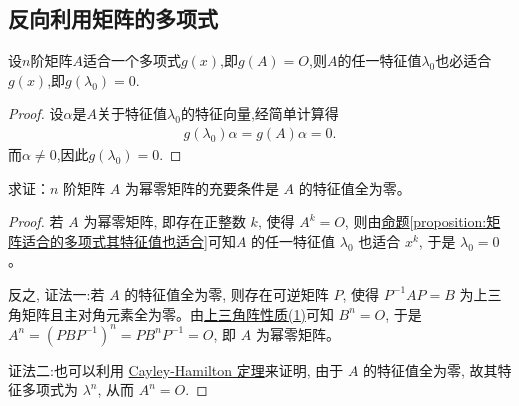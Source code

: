 \documentclass[../../main.tex]{subfiles}
\begin{document}
\subsection{反向利用矩阵的多项式}

\begin{proposition}\label{proposition:矩阵适合的多项式其特征值也适合}
设$n$阶矩阵$A$适合一个多项式$g(x)$,即$g(A) = O$,则$A$的任一特征值$\lambda_0$也必适合$g(x)$,即$g(\lambda_0) = 0$.
\end{proposition}
\begin{proof}
设$\alpha$是$A$关于特征值$\lambda_0$的特征向量,经简单计算得
\begin{align*}
g(\lambda_0) \alpha = g(A) \alpha = 0.
\end{align*}
而$\alpha \neq 0$,因此$g(\lambda_0) = 0$.
\end{proof}

\begin{proposition}[幂零矩阵关于特征值的充要条件]\label{proposition:幂零矩阵关于特征值的充要条件}
求证：$n$ 阶矩阵 $A$ 为幂零矩阵的充要条件是 $A$ 的特征值全为零。
\end{proposition}
\begin{proof}
若 $A$ 为幂零矩阵, 即存在正整数 $k$, 使得 $A^k = O$, 则由\hyperref[proposition:矩阵适合的多项式其特征值也适合]{命题\ref{proposition:矩阵适合的多项式其特征值也适合}}可知$A$ 的任一特征值 $\lambda_0$ 也适合 $x^k$, 于是 $\lambda_0 = 0$。

反之,
{\color{blue}证法一:}若 $A$ 的特征值全为零, 则存在可逆矩阵 $P$, 使得 $P^{-1}AP = B$ 为上三角矩阵且主对角元素全为零。由\hyperref[proposition:上三角阵性质]{上三角阵性质(1)}可知 $B^n = O$, 于是 $A^n = (PBP^{-1})^n = PB^nP^{-1} = O$, 即 $A$ 为幂零矩阵。

{\color{blue}证法二:}也可以利用 \hyperref[theorem:Cayley-Hamilton定理]{Cayley-Hamilton 定理}来证明, 由于 $A$ 的特征值全为零, 故其特征多项式为 $\lambda^n$, 从而 $A^n = O$.
\end{proof}
\end{document}

